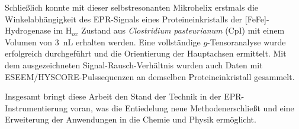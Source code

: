 Schließlich konnte mit dieser selbstresonanten Mikrohelix erstmals die Winkelabhängigkeit des EPR-Signals eines Proteineinkristalls der [FeFe]-Hydrogenase im H$_{ox}$ Zustand aus \textit{Clostridium pasteurianum} (CpI) mit einem Volumen von 3~nL erhalten werden. 
Eine vollständige $g$-Tensoranalyse wurde erfolgreich durchgeführt und die Orientierung der Hauptachsen ermittelt. Mit dem ausgezeichneten Signal-Rausch-Verhältnis wurden auch Daten mit ESEEM/HYSCORE-Pulssequenzen an demselben Proteineinkristall gesammelt.

Insgesamt bringt diese Arbeit den Stand der Technik in der EPR-Instrumentierung voran, was die Entiedelung neue Methodenerschlie{\ss}t und eine Erweiterung der Anwendungen in die Chemie und Physik ermöglicht.

